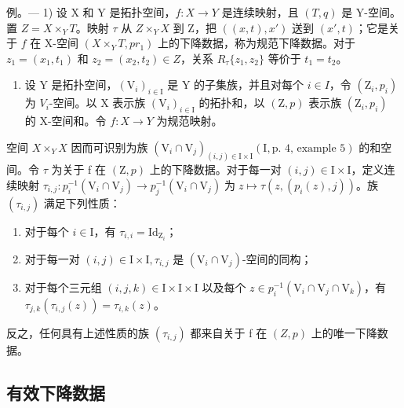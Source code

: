 例。--- 1) 设 X 和 Y 是拓扑空间，\(f\colon X \to Y\) 是连续映射，且 \((T,q)\) 是 Y-空间。置 \(Z = X \times_Y T\)。映射 \(\tau\) 从 \(Z \times_Y X\) 到 Z，把 \(((x,t),x')\) 送到 \((x',t)\)；它是关于 \(f\) 在 X-空间 \((X \times_Y T, pr_1)\) 上的下降数据，称为规范下降数据。对于 \(z_1 = (x_1, t_1)\) 和 \(z_2 = (x_2, t_2) \in Z\)，关系 \(R_{\tau}\{z_1, z_2\}\) 等价于 \(t_1 = t_2\)。

\begin{enumerate}
\def\labelenumi{\arabic{enumi})}
\setcounter{enumi}{1}
\tightlist
\item
  设 Y 是拓扑空间，\((\mathrm{V}_{i})_{i\in\mathrm{I}}\) 是 Y 的子集族，并且对每个 \(i\in I\)，令 \((\mathrm{Z}_{i},p_{i})\) 为 \(V_{i}\)-空间。以 X 表示族 \((\mathrm{V}_{i})_{i\in\mathrm{I}}\) 的拓扑和，以 \((\mathrm{Z},p)\) 表示族 \((\mathrm{Z}_{i},p_{i})\) 的 X-空间和。令 \(f:X\to Y\) 为规范映射。
\end{enumerate}

空间 \(X \times_{Y} X\) 因而可识别为族 \((\mathrm{V}_{i} \cap \mathrm{V}_{j})_{(i,j) \in \mathrm{I} \times \mathrm{I}}(\mathrm{I}, \text{p.~4, example 5})\) 的和空间。令 \(\tau\) 为关于 f 在 \((\mathrm{Z}, p)\) 上的下降数据。对于每一对 \((i, j) \in \mathrm{I} \times \mathrm{I}\)，定义连续映射 \(\tau_{i,j}\colon p_{i}^{-1}(\mathrm{V}_{i}\cap\mathrm{V}_{j})\to p_{j}^{-1}(\mathrm{V}_{i}\cap\mathrm{V}_{j})\;\text{为}\;z\mapsto\tau(z,(p_{i}(z),j))\)。族 \((\tau_{i,j})\) 满足下列性质：

\begin{enumerate}
\def\labelenumi{(\roman{enumi})}
\item
  对于每个 \(i \in \mathrm{I}\)，有 \(\tau_{i,i} = \mathrm{Id}_{\mathrm{Z}_i}\)；
\item
  对于每一对 \((i,j)\in \mathrm{I}\times \mathrm{I},\tau_{i,j}\) 是 \((\mathrm{V}_i\cap \mathrm{V}_j)\)-空间的同构；
\item
  对于每个三元组 \((i,j,k)\in\mathrm{I}\times \mathrm{I}\times \mathrm{I}\) 以及每个 \(z\in p_i^{-1} (\mathrm{V}_i\cap \mathrm{V}_j\cap \mathrm{V}_k)\)，有 \(\tau_{j,k}(\tau_{i,j}(z)) = \tau_{i,k}(z)\)。
\end{enumerate}

反之，任何具有上述性质的族 \((\tau_{i,j})\) 都来自关于 f 在 \((Z,p)\) 上的唯一下降数据。

\subsection{有效下降数据}

